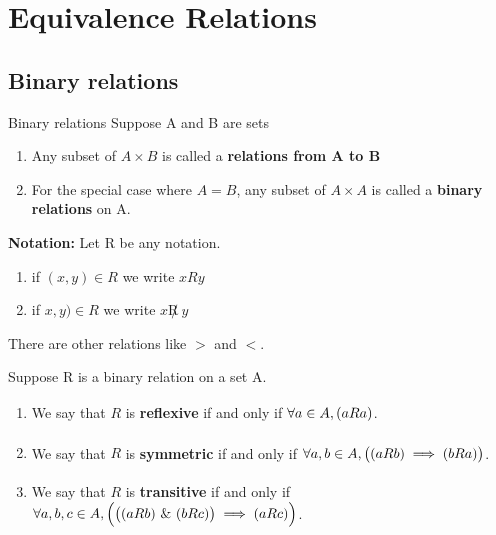 \documentclass[../MATH-2000-Notes.tex]{subfiles}
\begin{document}
\chapter{Equivalence Relations}
\section{Binary relations}
\begin{Definition}
    {Binary relations}
    Suppose A and B are sets
    \begin{enumerate}
        \item Any subset of \(A \times B\) is called a \textbf{relations from A to B}
        \item For the special case where \(A = B\), any subset of \(A \times A\) is called a \textbf{binary relations} on A.
    \end{enumerate}
\end{Definition}
\textbf{Notation:} Let R be any notation.
\begin{enumerate}
    \item if \((x,y) \in R\) we write \(xRy\)
    \item if \(x,y) \in R\) we write \(x\not R\ y\)
\end{enumerate}
There are other relations like \(>\) and \(<\).
\begin{Definition}
    {}
    Suppose R is a binary relation on a set A.
    \begin{enumerate}
        \item We say that $R$ is \textbf{reflexive} if and only if \quad
              $ \forall a \in A, (a R a) \vphantom{\Bigr)}$.
        \item We say that $R$ is \textbf{symmetric} if and only if \quad
              $ \forall a,b \in A, \bigl( (a R b) \implies (b R a) \bigr) \vphantom{\Bigr)}$.
        \item We say that $R$ is \textbf{transitive} if and only if \quad
              $ \forall a,b,c \in A, \Bigl( \bigl( (a R b)\ \text{\&}\ (b R c) \bigr) \implies (a R c) \Bigr) $.
    \end{enumerate}
\end{Definition}
\end{document}
